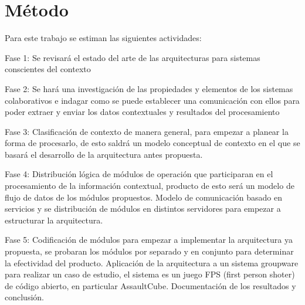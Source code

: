 \section{M\'etodo}
Para este trabajo se estiman las siguientes actividades:

Fase 1: Se revisar\'a el estado del arte de las arquitecturas para sistemas conscientes del contexto

Fase 2: Se har\'a una investigaci\'on de las propiedades y elementos de los sistemas colaborativos e indagar como se puede establecer una comunicaci\'on con ellos para poder extraer y enviar los datos contextuales y resultados del procesamiento

Fase 3: Clasificaci\'on de contexto de manera general, para empezar a planear la forma de procesarlo, de esto saldr\'a un modelo conceptual de contexto en el que se basar\'a el desarrollo de la arquitectura antes propuesta.

Fase 4: Distribuci\'on l\'ogica de m\'odulos de operaci\'on que participaran en el procesamiento de la informaci\'on contextual, producto de esto ser\'a un modelo de flujo de datos de los m\'odulos propuestos. Modelo de comunicaci\'on basado en servicios y se distribuci\'on de m\'odulos en distintos servidores para empezar a estructurar la arquitectura.

Fase 5: Codificaci\'on de m\'odulos para empezar a implementar la arquitectura ya propuesta, se probaran los m\'odulos por separado y en conjunto para determinar la efectividad del producto. Aplicaci\'on de la arquitectura a un sistema groupware para realizar un caso de estudio, el sistema es un juego FPS (first person shoter) de c\'odigo abierto, en particular AssaultCube. Documentaci\'on de los resultados y conclusi\'on.
